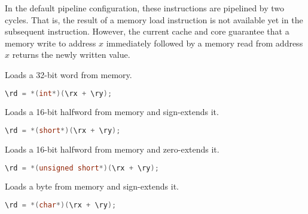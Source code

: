 In the default pipeline configuration, these instructions are pipelined by
two cycles. That is, the result of a memory load instruction is not available
yet in the subsequent instruction. However, the current cache and core guarantee
that a memory write to address $x$ immediately followed by a memory read from
address $x$ returns the newly written value.

Loads a 32-bit word from memory.

\begin{lstlisting}[numbers=none, basicstyle=\ttfamily\footnotesize, language=C++]
\rd = *(int*)(\rx + \ry);
\end{lstlisting}

Loads a 16-bit halfword from memory and sign-extends it.

\begin{lstlisting}[numbers=none, basicstyle=\ttfamily\footnotesize, language=C++]
\rd = *(short*)(\rx + \ry);
\end{lstlisting}

Loads a 16-bit halfword from memory and zero-extends it.

\begin{lstlisting}[numbers=none, basicstyle=\ttfamily\footnotesize, language=C++]
\rd = *(unsigned short*)(\rx + \ry);
\end{lstlisting}

Loads a byte from memory and sign-extends it.

\begin{lstlisting}[numbers=none, basicstyle=\ttfamily\footnotesize, language=C++]
\rd = *(char*)(\rx + \ry);
\end{lstlisting}

